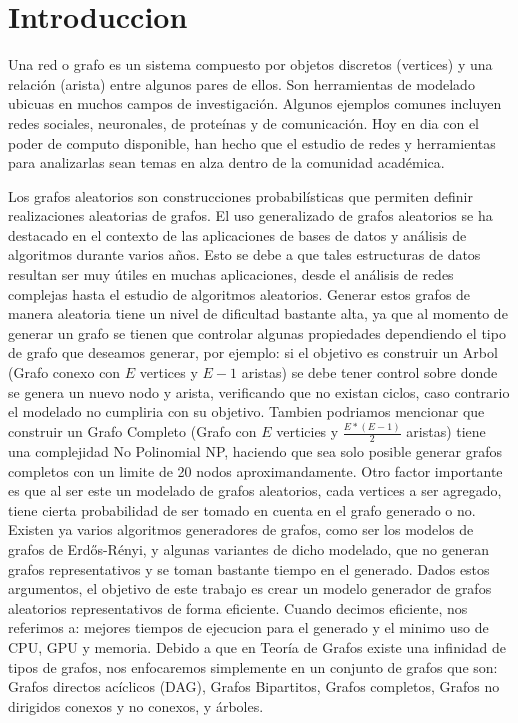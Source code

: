 \documentclass[11pt]{extarticle}
\begin{document}
\newcommand\justificacion{Justificaci\'on }
\newcommand\guion{\item[-]}

\renewcommand{\labelenumii}{\arabic{enumi}.\arabic{enumii}}
\renewcommand{\labelenumiii}{\arabic{enumi}.\arabic{enumii}.\arabic{enumiii}}
\renewcommand{\labelenumiv}{\arabic{enumi}.\arabic{enumii}.\arabic{enumiii}.\arabic{enumiv}}

\section{Introduccion} 
Una red o grafo es un sistema compuesto por objetos discretos (vertices) y una relación (arista) entre algunos pares
de ellos. Son herramientas de modelado ubicuas en muchos campos de investigación. 
Algunos ejemplos comunes incluyen redes sociales, neuronales, de proteínas y de comunicación.
Hoy en dia con el poder de computo disponible, han hecho que el estudio de redes y
herramientas para analizarlas sean temas en alza dentro de la comunidad académica.\hfill \break

Los grafos aleatorios son construcciones probabilísticas que permiten definir realizaciones
aleatorias de grafos. 
El uso generalizado de grafos aleatorios se ha destacado en el contexto de las  
aplicaciones de bases de datos y análisis de algoritmos durante 
varios años. Esto se debe a que tales estructuras de datos resultan ser muy útiles 
en muchas  aplicaciones, desde el análisis de redes complejas hasta el estudio de 
algoritmos aleatorios. Generar estos grafos de manera aleatoria tiene un nivel de dificultad
bastante alta, ya que al momento de generar un grafo se tienen que controlar algunas propiedades 
dependiendo el tipo de grafo que deseamos generar, por ejemplo: si el objetivo es construir un Arbol 
(Grafo conexo con \(E\) vertices y \(E - 1\) aristas)
se debe tener control sobre donde se genera un nuevo nodo y arista, verificando que no existan
ciclos, caso contrario el modelado no cumpliria con su objetivo. Tambien podriamos mencionar que construir
un Grafo Completo (Grafo con \(E\) verticies y \( \frac{E * (E - 1)}{2}\) aristas) tiene una complejidad No Polinomial NP, 
haciendo que sea solo posible generar grafos completos con un limite de 20 nodos aproximandamente.
Otro factor importante es que al ser este un modelado de grafos aleatorios, cada vertices a ser agregado,
tiene cierta probabilidad de ser tomado en cuenta en el grafo generado o no. 
Existen ya varios algoritmos generadores de grafos, como ser los modelos de grafos de Erdős-Rényi,
y algunas variantes de dicho modelado, que no generan grafos representativos y se toman bastante tiempo en 
el generado. Dados estos argumentos,  el objetivo de este trabajo es crear un modelo generador de grafos aleatorios representativos de 
forma eficiente. Cuando decimos eficiente, nos referimos a: mejores tiempos de ejecucion para
el generado y el minimo uso de CPU, GPU y memoria. \hfill \break \break
Debido a que en Teoría de Grafos existe una infinidad de tipos de grafos, nos enfocaremos simplemente en un conjunto 
de grafos que son: Grafos directos acíclicos (DAG), Grafos Bipartitos, Grafos completos, 
Grafos no dirigidos conexos y no conexos, y árboles.
\end{document}
